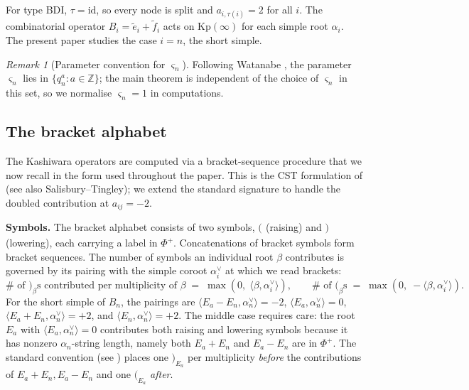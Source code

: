 \documentclass[11pt]{article}
\theoremstyle{definition}
\theoremstyle{remark}
\newtheorem{remark}[theorem]{Remark}
\newcommand{\Kp}{\mathrm{Kp}}
\newcommand{\labr}[1]{{)}_{#1}}
\newcommand{\labl}[1]{{(}_{#1}}
\begin{document}
For type BDI, $\tau = \mathrm{id}$, so every node is split and $a_{i,\tau(i)} = 2$ for all $i$.
The combinatorial operator $B_i = \tilde e_i + \tilde f_i$ acts on $\Kp(\infty)$ for each
simple root $\alpha_i$. The present paper studies the case $i = n$, the short simple.

\begin{remark}[Parameter convention for $\varsigma_n$]\label{rmk:varsigma-convention}
Following Watanabe \cite[\S3.3(D)]{Watanabe2110}, the parameter $\varsigma_n$ lies in
$\{q_n^a : a \in \mathbb{Z}\}$; the main theorem is independent of the choice of
$\varsigma_n$ in this set, so we normalise $\varsigma_n = 1$ in computations.
\end{remark}

\subsection{The bracket alphabet}\label{ssec:bracket-alphabet}

The Kashiwara operators are computed via a bracket-sequence procedure that we now recall in
the form used throughout the paper. This is the CST formulation of \cite[Definition~2.14]{CST}
(see also Salisbury--Tingley); we extend the standard signature to handle the doubled
contribution at $a_{ij} = -2$.

\medskip
\noindent\textbf{Symbols.}
The bracket alphabet consists of two symbols, $\labl{}$ (raising) and $\labr{}$ (lowering),
each carrying a label in $\Phi^+$. Concatenations of bracket symbols form bracket sequences.
The number of symbols an individual root $\beta$ contributes is governed by its pairing with
the simple coroot $\alpha_i^\vee$ at which we read brackets:
\[
\#\text{ of }\labr{\beta}\text{s contributed per multiplicity of }\beta \;=\; \max(0,\;\langle
\beta, \alpha_i^\vee\rangle), \qquad
\#\text{ of }\labl{\beta}\text{s} \;=\; \max(0,\;-\langle \beta, \alpha_i^\vee\rangle).
\]
For the short simple of $B_n$, the pairings are $\langle E_a - E_n, \alpha_n^\vee\rangle =
-2$, $\langle E_a, \alpha_n^\vee\rangle = 0$, $\langle E_a + E_n, \alpha_n^\vee\rangle = +2$,
and $\langle E_n, \alpha_n^\vee\rangle = +2$. The middle case requires care: the root $E_a$
with $\langle E_a, \alpha_n^\vee\rangle = 0$ contributes both raising and lowering symbols
because it has nonzero $\alpha_n$-string length, namely both $E_a + E_n$ and $E_a - E_n$ are
in $\Phi^+$. The standard convention (see \cite[\S2]{Kashiwara1991}) places one $\labr{E_a}$
per multiplicity \emph{before} the contributions of $E_a + E_n, E_a - E_n$ and one
$\labl{E_a}$ \emph{after}.
\end{document}
